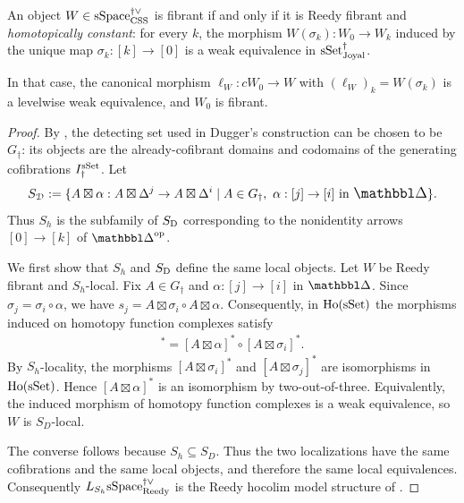 \documentclass[a4paper,dvipdfmx,11pt]{amsart}
\begin{document}
\begin{proposition}\label{cs.thm.resolution}
  An object $W\in\mathrm{sSpace}^{\dag\vee}_{\mathrm{CSS}}$ is fibrant if and only if it is Reedy fibrant and \emph{homotopically constant}:
  for every $k$, the morphism $W(\sigma_k):W_0\to W_k$ induced by the unique map $\sigma_k:[k]\to[0]$ is a weak equivalence in $\mathrm{sSet}^{\dag}_{\mathrm{Joyal}}$.
  
  In that case, the canonical morphism $\ell_W:cW_0\to W$ with $(\ell_W)_k=W(\sigma_k)$ is a levelwise weak equivalence, and $W_0$ is fibrant.
\end{proposition}

\begin{proof}
  By \cite[the proof of Proposition~A.5]{Dug01R}, the detecting set used in Dugger's construction can be chosen to be $G_{\dag}$: 
  its objects are the already-cofibrant domains and codomains of the generating cofibrations $I^{\mathrm{sSet}}_{\dag}$.
  Let
  \begin{align}
    S_{\D}
    :=
    \{A\boxtimes\alpha:
      A\boxtimes\Delta^j\to A\boxtimes\Delta^i
      \mid A\in G_{\dag},\ \alpha:[j]\to[i]\text{ in }\prism\}.
  \end{align}
  Thus $S_h$ is the subfamily of $S_{\mathrm{D}}$ corresponding to the nonidentity arrows $[0]\to[k]$ of $\prism^{\myop}$.

  We first show that $S_h$ and $S_{\mathrm{D}}$ define the same local objects.
  Let $W$ be Reedy fibrant and $S_h$-local.
  Fix $A\in G_{\dag}$ and $\alpha:[j]\to[i]$ in $\prism$.
  Since $\sigma_j=\sigma_i\circ\alpha$, we have $s_j=A\boxtimes\sigma_{i}\circ A\boxtimes\alpha$.
  Consequently, in $\mathrm{Ho}(\mathrm{sSet})$ the morphisms induced on homotopy function complexes satisfy
  \begin{align}
    [A\boxtimes\sigma_{j}]^*=[A\boxtimes\alpha]^*\circ[A\boxtimes\sigma_{i}]^*.
  \end{align}
  By $S_h$-locality, the morphisms $[A\boxtimes\sigma_{i}]^*$ and $[A\boxtimes\sigma_{j}]^*$ are isomorphisms in $\mathrm{Ho}(\mathrm{sSet})$.
  Hence $[A\boxtimes\alpha]^*$ is an isomorphism by two-out-of-three.
  Equivalently, the induced morphism of homotopy function complexes is a weak equivalence, so $W$ is $S_{D}$-local.

  The converse follows because $S_h\subseteq S_{D}$.
  Thus the two localizations have the same cofibrations and the same local objects, and therefore the same local equivalences.
  Consequently $L_{S_h}\mathrm{sSpace}^{\dag\vee}_{\mathrm{Reedy}}$ is the Reedy hocolim model structure of \cite[Theorem~5.7]{Dug01R}.


\end{proof}
\end{document}
